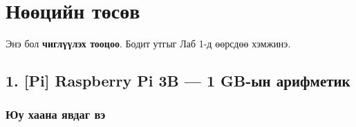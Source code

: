 \chapter{Нөөцийн төсөв}

Энэ бол \textbf{чиглүүлэх тооцоо}. Бодит утгыг Лаб 1-д өөрсдөө хэмжинэ.

\hypertarget{pi-raspberry-pi-3b-1-gb-ux44bux43d-ux430ux440ux438ux444ux43cux435ux442ux438ux43a}{%
\section{1. {[}Pi{]} Raspberry Pi 3B --- 1 GB-ын арифметик}\label{pi-raspberry-pi-3b-1-gb-ux44bux43d-ux430ux440ux438ux444ux43cux435ux442ux438ux43a}}

\hypertarget{ux44eux443-ux445ux430ux430ux43dux430-ux44fux432ux434ux430ux433-ux432ux44d}{%
\subsection{Юу хаана явдаг вэ}\label{ux44eux443-ux445ux430ux430ux43dux430-ux44fux432ux434ux430ux433-ux432ux44d}}

